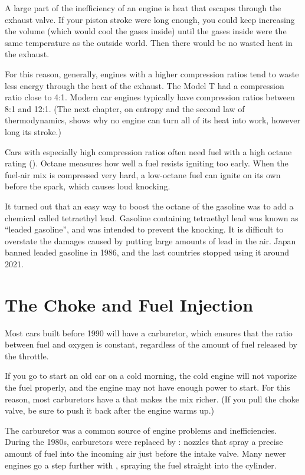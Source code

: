 A large part of the inefficiency of an engine is heat that escapes through the exhaust valve. If your piston stroke were long enough, you could keep increasing the volume (which would cool the gases inside) until the gases inside were the same temperature as the outside world. Then there would be no wasted heat in the exhaust.

For this reason, generally, engines with a higher compression ratios tend to waste less energy through the heat of the exhaust. The Model T had a compression ratio close to 4:1. Modern car engines typically have compression ratios between 8:1 and 12:1. (The next chapter, on entropy and the second law of thermodynamics, shows why no engine can turn all of its heat into work, however long its stroke.) 

Cars with especially high compression ratios often need fuel with a high octane rating (). Octane measures how well a fuel resists igniting too early. When the fuel-air mix is compressed very hard, a low-octane fuel can ignite on its own before the spark, which causes loud knocking.

It turned out that an easy way to boost the octane of the gasoline was to add a chemical called tetraethyl lead. Gasoline containing tetraethyl lead was known as ``leaded gasoline'', and was intended to prevent the knocking.  It is difficult to overstate the damages caused by putting large amounts of lead in the air. Japan banned leaded gasoline in 1986, and the last countries stopped using it around 2021.

\section{The Choke and Fuel Injection}

Most cars built before 1990 will have a carburetor, which ensures that the ratio between fuel and oxygen is constant, regardless of the amount of fuel released by the throttle.  

If you go to start an old car on a cold morning, the cold engine will not vaporize the fuel properly, and the engine may not have enough power to start.  For this reason, most carburetors have a  that makes the mix richer. (If you pull the choke valve, be sure to push it back after the engine warms up.)

The carburetor was a common source of engine problems and inefficiencies.  During the 1980s, carburetors were replaced by : nozzles that spray a precise amount of fuel into the incoming air just before the intake valve. Many newer engines go a step further with , spraying the fuel straight into the cylinder.

